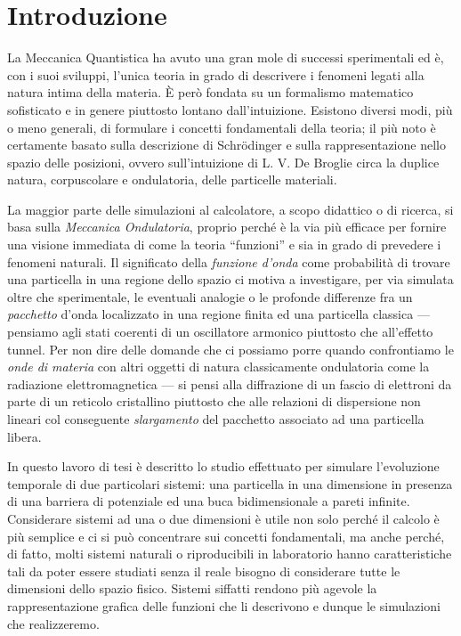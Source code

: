 
\chapter*{Introduzione} \label{introduzione}


La Meccanica Quantistica ha avuto una gran mole di successi
sperimentali ed è, con i suoi sviluppi, l'unica teoria
in grado di descrivere i fenomeni legati alla natura intima
della materia. \`E però fondata su un 
formalismo matematico sofisticato e in genere piuttosto lontano
dall'intuizione. Esistono diversi modi, più o meno generali,
di formulare i concetti fondamentali della teoria; il più noto
è certamente basato sulla descrizione di Schr\"odinger e sulla
rappresentazione nello spazio delle posizioni, ovvero
sull'intuizione di L. V. De Broglie circa la duplice natura,
corpuscolare e ondulatoria, delle particelle materiali. 

La maggior parte delle simulazioni al calcolatore, a scopo didattico
o di ricerca, si basa sulla \emph{Meccanica Ondulatoria}, proprio
perché è la via più efficace per fornire una visione immediata 
di come la teoria ``funzioni'' e sia in grado di prevedere
i fenomeni naturali. Il significato della \emph{funzione d'onda}
come probabilità di trovare una particella in una regione dello spazio
ci motiva a investigare, per via simulata oltre che sperimentale,
le eventuali analogie o le profonde differenze fra un \emph{pacchetto}
d'onda localizzato in una regione finita ed una particella classica 
--- pensiamo agli stati coerenti di un oscillatore armonico piuttosto che
all'effetto tunnel. Per non dire delle domande che ci possiamo
porre quando confrontiamo le \emph{onde di materia} con altri oggetti
di natura classicamente ondulatoria come 
la radiazione elettromagnetica --- si pensi alla diffrazione di un fascio di 
elettroni da parte di un reticolo cristallino piuttosto che alle relazioni
di dispersione non lineari col conseguente \emph{slargamento} del 
pacchetto associato ad una particella libera.

In questo lavoro di tesi è descritto lo studio effettuato per
simulare l'evoluzione temporale di due particolari
sistemi: una particella in una dimensione in
presenza di una barriera di potenziale ed una buca bidimensionale
a pareti infinite. Considerare sistemi ad una o due dimensioni è utile 
non solo perché il calcolo è più semplice
e ci si può concentrare sui concetti fondamentali, ma anche perché,
di fatto, molti sistemi naturali o riproducibili in laboratorio 
hanno caratteristiche tali da poter
essere studiati senza il reale bisogno di considerare tutte
le dimensioni dello spazio fisico. Sistemi siffatti rendono 
più agevole la rappresentazione grafica delle funzioni che li
descrivono e dunque le simulazioni che realizzeremo.

